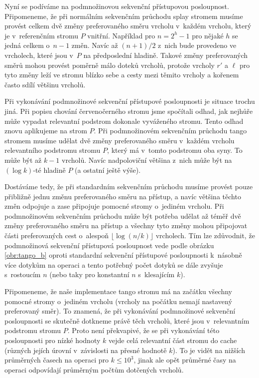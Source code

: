 Nyní se podíváme na podmnožinovou sekvenční přístupovou posloupnost.
Připomeneme, že při normálním sekvenčním průchodu splay stromem musíme provést
celkem dvě změny preferovaného směru vrcholu v~každém vrcholu, který je
v~referenčním stromu $P$ vnitřní. Například pro $n=2^h-1$ pro nějaké $h$ se jedná
celkem o~$n - 1$ změn. Navíc až $(n+1)/2$ z~nich bude provedeno ve vrcholech, které jsou
v~$P$ na předposlední hladině. Takové změny preferovaných směrů mohou provést
poměrně málo doteků vrcholů, protože vrcholy $r'$ a $\ell$ pro tyto změny leží
ve stromu blízko sebe a cesty mezi těmito vrcholy a kořenem často sdílí většinu
vrcholů. 

Při vykonávání podmnožinové sekvenční přístupové posloupnosti je situace trochu
jiná. Při popisu chování červenočerného stromu jsme spočítali odhad, jak nejhůře
může vypadat relevantní podstrom dokonale vyváženého stromu. Tento odhad znovu
aplikujeme na strom $P$. Při podmnožinovém sekvenčním průchodu tango stromem
musíme udělat dvě změny preferovaného směru v~každém vrcholu relevantního
podstromu stromu $P$, který má v~tomto podstromu oba syny. To může být až $k-1$
vrcholů. Navíc nadpoloviční většina z~nich může být na $(\log k)$-té hladině $P$
(a ostatní ještě výše).

Dostáváme tedy, že při standardním sekvenčním průchodu musíme provést pouze
přibližně jednu změnu preferovaného směru na přístup, a navíc většina
těchto změn odpojuje a zase připojuje pomocné stromy o~jediném vrcholu. Při
podmnožinovém sekvenčním průchodu může být potřeba udělat až téměř dvě změny
preferovaného směru na přístup a všechny tyto změny mohou připojovat
části preferovaných cest o~alespoň $\lfloor\log (n/k)\rfloor$ vrcholech. Tím
lze zdůvodnit, že podmnožinová sekvenční přístupová posloupnost vede podle obrázku \ref{obr:tango_b} oproti
standardní sekvenční přístupové posloupnosti k~násobně více dotykům na operaci a tento
potřebný počet dotyků se dále zvyšuje s~rostoucím $n$ (nebo taky pro konstantní $n$
s~klesajícím $k$). 

Připomeneme, že naše implementace tango stromu má na začátku všechny pomocné
stromy o~jediném vrcholu (vrcholy na počátku nemají nastavený preferovaný
směr). To znamená, že při vykonávání podmnožinové sekvenční posloupnosti se
skutečně dotkneme právě těch vrcholů, které jsou v~relevantním podstromu stromu
$P$. Proto není překvapivé, že se při vykonávání této posloupnosti pro nízké
hodnoty $k$ vejde celá relevantní část stromu do cache (různých jejích úrovní
v~závislosti na přesné hodnotě $k$). To je vidět na nižších průměrných časech na
operaci pro $k \leq  10^3$, jinak ale opět průměrné časy na operaci
odpovídají průměrným počtům dotčených vrcholů.

